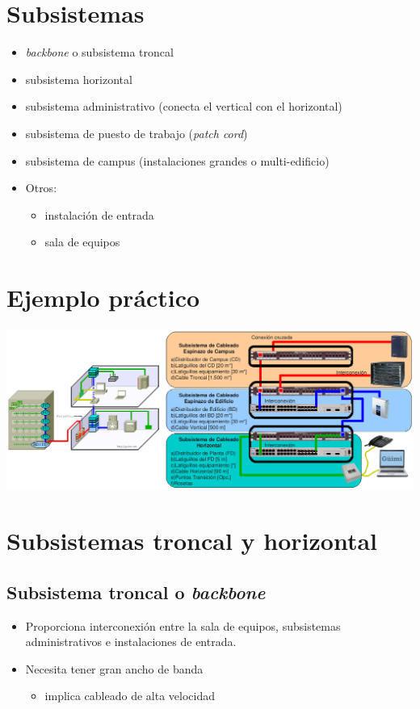 \documentclass[11pt]{article}
\begin{document}
\section{Subsistemas}
\label{sec:orge5772fb}
\begin{itemize}
\item \emph{backbone} o subsistema troncal
\item subsistema horizontal
\item subsistema administrativo (conecta el vertical con el horizontal)
\item subsistema de puesto de trabajo (\emph{patch cord})
\item subsistema de campus (instalaciones grandes o multi-edificio)
\item Otros:
\begin{itemize}
\item instalación de entrada
\item sala de equipos
\end{itemize}
\end{itemize}



\section{Ejemplo práctico}
\label{sec:orgbceb9b0}
\begin{center}
\includegraphics[width=.9\linewidth]{./media/ejemplo-cableado1.png}
\end{center}

\section{Subsistemas troncal y horizontal}
\label{sec:org8544716}
\subsection{Subsistema troncal o \emph{backbone}}
\label{sec:org85a8878}
\begin{itemize}
\item Proporciona interconexión entre la sala de equipos, subsistemas administrativos e instalaciones de entrada.
\item Necesita tener gran ancho de banda
\begin{itemize}
\item implica cableado de alta velocidad
\end{itemize}
\end{itemize}
\end{document}
